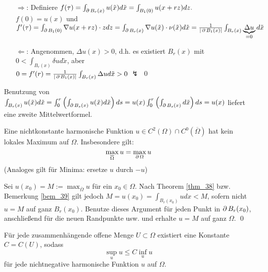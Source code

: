 	\begin{itemize}
		\item[\glqq$\Rightarrow$\grqq:] Definiere $f(\tau) = \int_{\operatorname{\partial} B_r(x)} u(\tilde{x}) d\tilde{x} = \int_{B_1(0)} u(x+rz) dz.$ \\
		$f(0) = u(x)$ und $f'(\tau) = \int_{\operatorname{\partial} B_1(0)} \nabla u(x+rz)\cdot z dz = \int_{\operatorname{\partial} B_r(x)} \nabla u(\tilde{x}) \cdot \nu(\tilde{x}) d \tilde{x} = \frac{1}{|\operatorname{\partial} B_1(x)|} \int_{B_r(x)} \underbrace{\Delta u}_{=0} d \tilde{x}$
		\item[\glqq$\Leftarrow$\grqq:] Angenommen, $\Delta u(x) > 0$, d.h. es existiert $B_r(x)$ mit $0 < \int_{B_r(x)} \delta u d \tilde{x}$, aber \\ $0 = f'(r) = \frac{1}{|\operatorname{\partial} B_1(x)|} \int_{B_r(x)} \Delta u d \tilde{x} > 0$ $\lightning$ \qed
	\end{itemize}

\begin{bem} \label{bem_39}
	Benutzung \marginnote{[39]} von $\int_{B_r(x)} u(\tilde{x})d\tilde{x} = \int_{0}^{r} \left( \int_{\operatorname{\partial} B_s(x)} u(\tilde{x}) d \tilde{x} \right) ds = u(x) \int_0^r \left( \int_{\operatorname{\partial} B_s(x)} d \tilde{x} \right) ds = u(x)$ liefert eine zweite Mittelwertformel.
\end{bem}
	
\begin{thm} \label{thm:starkes_maximum} \label{thm_40}
	Eine nichtkonstante harmonische Funktion $u \in C^2(\Omega) \cap C^0(\overline{\Omega})$ hat kein lokales Maximum auf $\Omega$.\marginnote{[40]} Insbesondere gilt:
	\[ \max_{\overline{\Omega}} u = \max_{\operatorname{\partial} \Omega} u \]
	(Analoges gilt für Minima: ersetze $u$ durch $-u$)
\end{thm}
	
	Sei $u(x_0) = M := \max_{\overline{\Omega}} u$ für ein $x_0 \in \Omega$. Nach Theorem \ref{thm_38} bzw. Bemerkung \ref{bem_39} gilt jedoch $M = u(x_0) = \int_{B_r(x_0)} u dx < M$, sofern nicht $u = M$ auf ganz $B_r(x_0)$. Benutze dieses Argument für jeden Punkt in $\operatorname{\partial} B_r(x_0)$, anschließend für die neuen Randpunkte usw. und erhalte $u = M$ auf ganz $\Omega$. \qed

\begin{thm} \label{thm:harnack-ungl} \label{thm_41}
	Für jede zusammenhängende offene Menge $U \subset \Omega$ existiert eine Konstante $C = C(U)$, sodass \marginnote{[41]}
	\[ \sup_u u \leq C \inf_u u \]
	für jede nichtnegative harmonische Funktion $u$ auf $\Omega$.
\end{thm}
	
